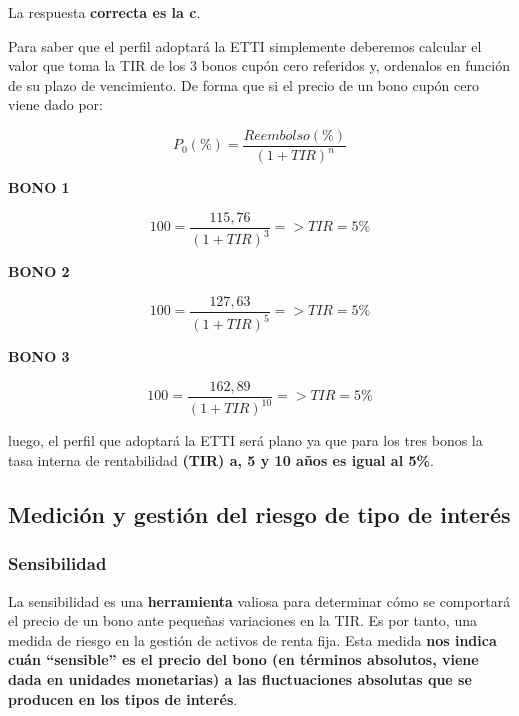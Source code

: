 \documentclass[
  letterpaper,
  DIV=11,
  numbers=noendperiod]{scrartcl}
\begin{document}
\begin{tcolorbox}[enhanced jigsaw, colframe=quarto-callout-tip-color-frame, opacityback=0, colback=white, leftrule=.75mm, left=2mm, breakable, arc=.35mm, rightrule=.15mm, toprule=.15mm, bottomrule=.15mm]
\begin{minipage}[t]{5.5mm}
\textcolor{quarto-callout-tip-color}{\faLightbulb}
\end{minipage}%
\begin{minipage}[t]{\textwidth - 5.5mm}

La respuesta \textbf{correcta es la c}.

Para saber que el perfil adoptará la ETTI simplemente deberemos calcular
el valor que toma la TIR de los 3 bonos cupón cero referidos y,
ordenalos en función de su plazo de vencimiento. De forma que si el
precio de un bono cupón cero viene dado por:

\[P_0(\%)=\frac{Reembolso(\%)}{(1+TIR)^{n}}\]

\textbf{BONO 1}

\[100=\frac{115,76}{(1+TIR)^{3}}=>TIR=5\%\]

\textbf{BONO 2}

\[100=\frac{127,63}{(1+TIR)^{5}}=>TIR=5\%\]

\textbf{BONO 3}

\[100=\frac{162,89}{(1+TIR)^{10}}=>TIR=5\%\]

luego, el perfil que adoptará la ETTI será plano ya que para los tres
bonos la tasa interna de rentabilidad \textbf{(TIR) a, 5 y 10 años es
igual al 5\%}.

\end{minipage}%
\end{tcolorbox}

\hypertarget{mediciuxf3n-y-gestiuxf3n-del-riesgo-de-tipo-de-interuxe9s}{%
\subsection{Medición y gestión del riesgo de tipo de
interés}\label{mediciuxf3n-y-gestiuxf3n-del-riesgo-de-tipo-de-interuxe9s}}

\hypertarget{sensibilidad}{%
\subsubsection{Sensibilidad}\label{sensibilidad}}

La sensibilidad es una \textbf{herramienta} valiosa para determinar cómo
se comportará el precio de un bono ante pequeñas variaciones en la TIR.
Es por tanto, una medida de riesgo en la gestión de activos de renta
fija. Esta medida \textbf{nos indica cuán ``sensible'' es el precio del
bono (en términos absolutos, viene dada en unidades monetarias) a las
fluctuaciones absolutas que se producen en los tipos de interés}.
\end{document}
